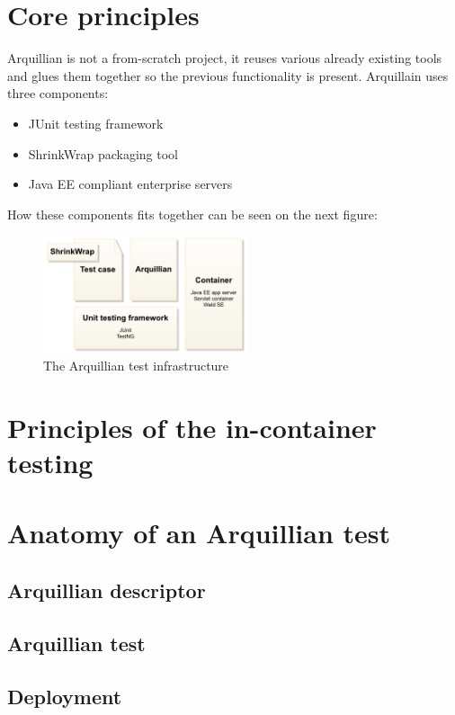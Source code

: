 \documentclass[12pt,final,oneside]{fithesis}
\begin{document}
	\section{Core principles}
	
Arquillian is not a from-scratch project, it reuses various already existing tools and glues them together so the previous functionality is present. Arquillain uses three components:

\begin{itemize}
\item{JUnit testing framework}
\item{ShrinkWrap packaging tool}
\item{Java EE compliant enterprise servers}
\end{itemize}

How these components fits together can be seen on the next figure:

\begin{figure}[!ht]
	\centering
	\includegraphics[width=60mm]{img/architecture-overview.png}
	\caption{The Arquillian test infrastructure}
	\label{fig:arquillian_test_infrastructure}
\end{figure}

	\section{Principles of the in-container testing}
	\section{Anatomy of an Arquillian test}
		\subsection{Arquillian descriptor}
		\subsection{Arquillian test}
		\subsection{Deployment}
\end{document}
